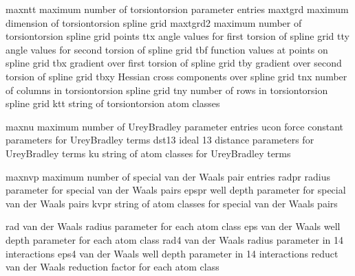 \documentclass[letterpaper,11pt,english]{sphinxmanual}
\begin{document}

\begin{sphinxVerbatim}[commandchars=\\\{\}]
maxntt          maximum number of torsion\PYGZhy{}torsion parameter entries
maxtgrd         maximum dimension of torsion\PYGZhy{}torsion spline grid
maxtgrd2        maximum number of torsion\PYGZhy{}torsion spline grid points
ttx             angle values for first torsion of spline grid
tty             angle values for second torsion of spline grid
tbf             function values at points on spline grid
tbx             gradient over first torsion of spline grid
tby             gradient over second torsion of spline grid
tbxy            Hessian cross components over spline grid
tnx             number of columns in torsion\PYGZhy{}torsion spline grid
tny             number of rows in torsion\PYGZhy{}torsion spline grid
ktt             string of torsion\PYGZhy{}torsion atom classes
\end{sphinxVerbatim}


\begin{sphinxVerbatim}[commandchars=\\\{\}]
maxnu           maximum number of Urey\PYGZhy{}Bradley parameter entries
ucon            force constant parameters for Urey\PYGZhy{}Bradley terms
dst13           ideal 1\PYGZhy{}3 distance parameters for Urey\PYGZhy{}Bradley terms
ku              string of atom classes for Urey\PYGZhy{}Bradley terms
\end{sphinxVerbatim}


\begin{sphinxVerbatim}[commandchars=\\\{\}]
maxnvp          maximum number of special van der Waals pair entries
radpr           radius parameter for special van der Waals pairs
epspr           well depth parameter for special van der Waals pairs
kvpr            string of atom classes for special van der Waals pairs
\end{sphinxVerbatim}


\begin{sphinxVerbatim}[commandchars=\\\{\}]
rad             van der Waals radius parameter for each atom class
eps             van der Waals well depth parameter for each atom class
rad4            van der Waals radius parameter in 1\PYGZhy{}4 interactions
eps4            van der Waals well depth parameter in 1\PYGZhy{}4 interactions
reduct          van der Waals reduction factor for each atom class
\end{sphinxVerbatim}
\end{document}
